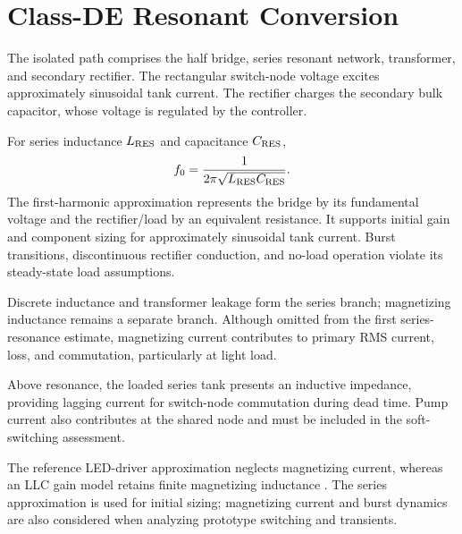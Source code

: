 \section{Class-DE Resonant Conversion}
\label{sec:bg-classde}

The isolated path comprises the half bridge, series resonant network, transformer, and secondary rectifier. The rectangular switch-node voltage excites approximately sinusoidal tank current. The rectifier charges the secondary bulk capacitor, whose voltage is regulated by the controller.

For series inductance \(L_{\mathrm{RES}}\) and capacitance \(C_{\mathrm{RES}}\),
\begin{equation}
f_0=\frac{1}{2\pi\sqrt{L_{\mathrm{RES}}C_{\mathrm{RES}}}}.
\label{eq:bg-series-resonance}
\end{equation}
The first-harmonic approximation represents the bridge by its fundamental voltage and the rectifier/load by an equivalent resistance. It supports initial gain and component sizing for approximately sinusoidal tank current. Burst transitions, discontinuous rectifier conduction, and no-load operation violate its steady-state load assumptions.

Discrete inductance and transformer leakage form the series branch; magnetizing inductance remains a separate branch. Although omitted from the first series-resonance estimate, magnetizing current contributes to primary RMS current, loss, and commutation, particularly at light load.

Above resonance, the loaded series tank presents an inductive impedance, providing lagging current for switch-node commutation during dead time. Pump current also contributes at the shared node and must be included in the soft-switching assessment.

The reference LED-driver approximation neglects magnetizing current, whereas an LLC gain model retains finite magnetizing inductance \cite{ammar2021led}. The series approximation is used for initial sizing; magnetizing current and burst dynamics are also considered when analyzing prototype switching and transients.
